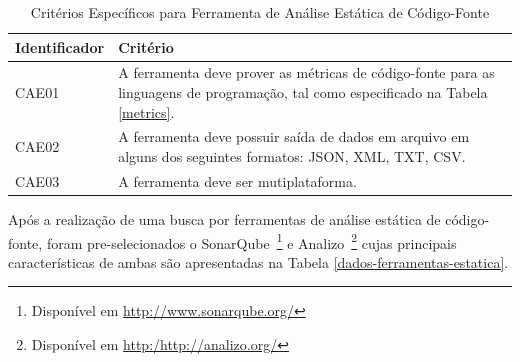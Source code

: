 	\begin{table}[!ht]
	\begin{center}
	 \begin{tabular}{|l|p{10cm}|}
		\hline
		Identificador & Critério 
		\\ \hline
		CAE01 & A ferramenta deve prover as métricas de código-fonte para as linguagens de programação, tal como especificado na Tabela \ref{metrics}.
		\\ \hline
		CAE02 & A ferramenta deve possuir saída de dados em arquivo em alguns dos seguintes formatos: JSON, XML, TXT, CSV.      
		\\ \hline
		CAE03 & A ferramenta deve ser mutiplataforma.
		\\ \hline
		\end{tabular}
		\caption{Critérios Específicos para Ferramenta de Análise Estática de Código-Fonte}
		\label{specific}
		\end{center}
		\end{table}	

Após a realização de uma busca por ferramentas de análise estática de código-fonte, foram pre-selecionados o SonarQube~\footnote{Disponível em \url{http://www.sonarqube.org/}} e Analizo~\footnote{Disponível em \url{http:/http://analizo.org/}} cujas principais características de ambas são apresentadas na Tabela \ref{dados-ferramentas-estatica}.

